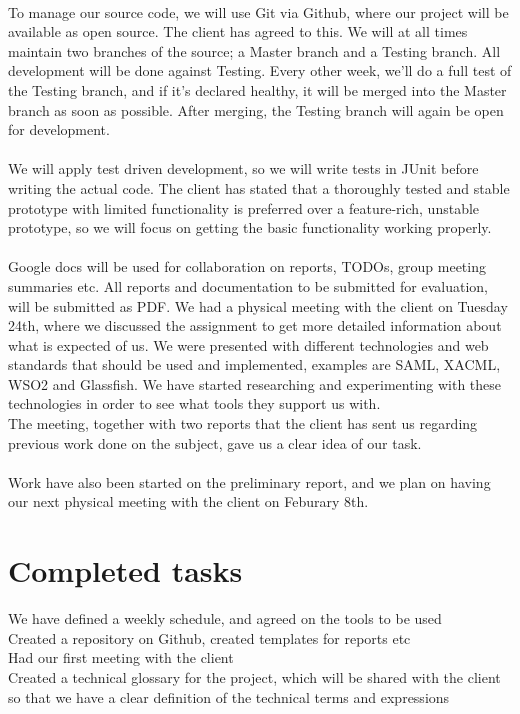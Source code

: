 \documentclass[titlepage]{article}
\begin{document}
\\To manage our source code, we will use Git via Github, where our project will be available as open source. The client has agreed to this. We will at all times maintain two branches of the source; a Master branch and a Testing branch. All development will be done against Testing. Every other week, we'll do a full test of the Testing branch, and if it's declared healthy, it will be merged into the Master branch as soon as possible. After merging, the Testing branch will again be open for development.
\\\\
        We will apply test driven development, so we will write tests in JUnit before writing the actual code. The client has stated that a thoroughly tested and stable prototype with limited functionality is preferred over a feature-rich, unstable prototype, so we will focus on getting the basic functionality working properly.
\\\\
        Google docs will be used for collaboration on reports, TODOs, group meeting summaries etc. All reports and documentation to be submitted for evaluation, will be submitted as PDF.
We had a physical meeting with the client on Tuesday 24th, where we discussed the assignment to get more detailed information about what is expected of us. We were presented with different technologies and web standards that should be used and implemented, examples are SAML, XACML, WSO2 and Glassfish. We have started researching and experimenting with these technologies in order to see what tools they support us with. 
\\The meeting, together with two reports that the client has sent us regarding previous work done on the subject, gave us a clear idea of our task.
\\\\
        Work have also been started on the preliminary report, and we plan on having our next physical meeting with the client on Feburary 8th.


    \section*{Completed tasks}
        We have defined a weekly schedule, and agreed on the tools to be used
\\Created a repository on Github, created templates for reports etc
\\Had our first meeting with the client
\\Created a technical glossary for the project, which will be shared with the client so that we have a clear definition of the technical terms and expressions
\end{document}
